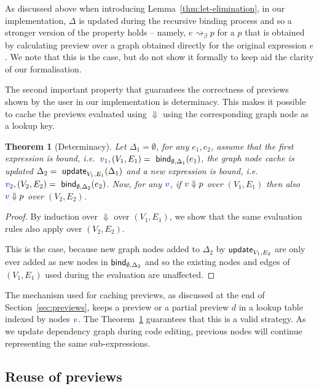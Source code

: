 \documentclass[sigplan,10pt]{acmart}\settopmatter{printfolios=true,printccs=false,printacmref=false}
\newcounter{thc}
\theoremstyle{plain}
\newtheorem{theorem}[thc]{Theorem}
\theoremstyle{definition}
\newcommand{\ident}[1]{\textnormal{\sffamily #1}}
\newcommand{\bndclr}[1]{\textcolor{kvdclr}{#1}}
\begin{document}
As discussed above when introducing Lemma~\ref{thm:let-elimination}, in our implementation,
$\Delta$ is updated during the recursive binding process and so a stronger version of the property
holds -- namely, $e \rightsquigarrow_\beta p$ for a $p$ that is obtained by calculating preview 
over a graph obtained directly for the original expression $e$. We note that this is the case, but
do not show it formally to keep aid the clarity of our formalisation.

The second important property that guarantees the correctness of previews shown by the user in 
our implementation is determinacy. This makes it possible to cache the previews evaluated using
$\Downarrow$ using the corresponding graph node as a lookup key.

\begin{theorem}[Determinacy]
\label{thm:determinacy}
Let $\Delta_1 = \emptyset$, for any $e_1, e_2$, assume that the first expression is bound,
i.e.~$\bndclr{v_1}, (V_1, E_1) = \ident{bind}_{\emptyset, \Delta_1}(e_1)$, the graph node cache
is updated $\Delta_2 = \ident{update}_{V_1, E_1}(\Delta_1)$ and a new expression is bound, i.e.~
$\bndclr{v_2}, (V_2, E_2) = \ident{bind}_{\emptyset, \Delta_2}(e_2)$. Now, for any $\bndclr{v}$, 
if $\bndclr{v} \Downarrow p$ over $(V_1, E_1)$ then also
 $\bndclr{v} \Downarrow p$ over $(V_2, E_2)$.
\end{theorem}
\begin{proof}
By induction over $\Downarrow$ over $(V_1, E_1)$, we show that the same evaluation rules also
apply over $(V_2, E_2)$. 

This is the case, because new graph nodes added to $\Delta_2$ by $\ident{update}_{V_1, E_2}$
are only ever added as new nodes in $\ident{bind}_{\emptyset, \Delta_2}$ and so the existing 
nodes and edges of $(V_1, E_1)$ used during the evaluation are unaffected.
\end{proof}

The mechanism used for caching previews, as discussed at the end of Section~\ref{sec:previews},
keeps a preview or a partial preview $d$ in a lookup table indexed by nodes $\bndclr{v}$. The
Theorem~\ref{thm:determinacy} guarantees that this is a valid strategy. As we update dependency
graph during code editing, previous nodes will continue representing the same sub-expressions.


\subsection{Reuse of previews}
\label{sec:properties-reuse}
\end{document}
